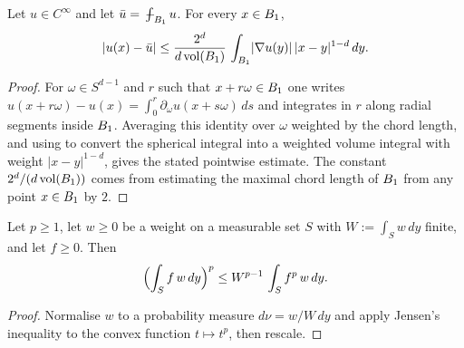 \begin{lemma}
\label{lem:representation_formula_smooth}
\leanok
Let $u \in C^{\infty}$ and let $\bar u = \fint_{\Bz{1}} u$. For every $x \in B_{1}$,
\begin{equation*}
\lvert u(x) - \bar u\rvert
\le \frac{2^{d}}{d\,\mathrm{vol}(B_{1})}\,
\int_{B_{1}} \lvert \nabla u(y)\rvert\, \lvert x - y\rvert^{1-d}\, dy.
\end{equation*}
\end{lemma}
\begin{proof}
\leanok
{}

For $\omega \in S^{d-1}$ and $r$ such that $x + r\omega \in B_{1}$ one writes
$u(x+r\omega) - u(x) = \int_{0}^{r} \partial_{\omega} u(x + s\omega)\, ds$ and integrates
in $r$ along radial segments inside $B_{1}$. Averaging this identity over $\omega$
weighted by the chord length, and using
 to convert the spherical integral into a
weighted volume integral with weight $\lvert x - y\rvert^{1-d}$, gives the stated
pointwise estimate. The constant $2^{d}/(d\,\mathrm{vol}(B_{1}))$ comes from estimating
the maximal chord length of $B_{1}$ from any point $x \in B_{1}$ by $2$.
\end{proof}

\begin{lemma}
\label{lem:weighted_power_mean_setIntegral}
\leanok
Let $p \ge 1$, let $w \ge 0$ be a weight on a measurable set $S$ with $W := \int_S w\, dy$
finite, and let $f \ge 0$. Then
\begin{equation*}
\Bigl(\int_S f\,w\, dy\Bigr)^{p}
\le W^{p-1}\, \int_S f^{p}\,w\, dy.
\end{equation*}
\end{lemma}
\begin{proof}
\leanok

Normalise $w$ to a probability measure $d\nu = w/W\, dy$ and apply Jensen's inequality
to the convex function $t \mapsto t^{p}$, then rescale.
\end{proof}

